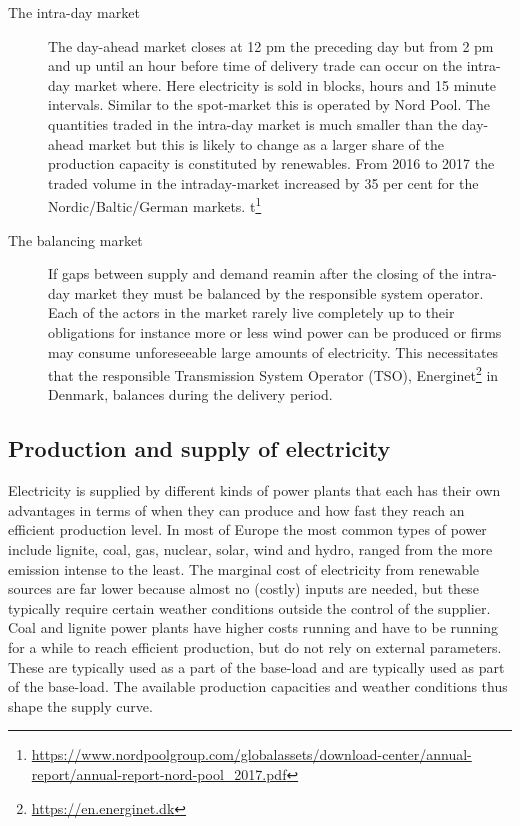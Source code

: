 \begin{description}
    \item [The intra-day market]
     The day-ahead market closes at 12 pm the preceding day but from 2 pm and up until an hour before time of delivery trade can occur on the intra-day market where. Here electricity is sold in blocks, hours and 15 minute intervals. Similar to the spot-market this is operated by Nord Pool. The quantities traded in the intra-day market is much smaller than the day-ahead market but this is likely to change as a larger share of the production capacity is constituted by renewables. From 2016 to 2017 the traded volume in the intraday-market increased by 35 per cent for the Nordic/Baltic/German markets.  t\footnote{\url{https://www.nordpoolgroup.com/globalassets/download-center/annual-report/annual-report-nord-pool_2017.pdf}}  %

    \item [The balancing market]
    If gaps between supply and demand reamin after the closing of the intra-day market they must be balanced by the responsible system operator. Each of the actors in the market rarely live completely up to their obligations for instance more or less wind power can be produced or firms may consume unforeseeable large amounts of electricity. This necessitates that the responsible Transmission System Operator (TSO), Energinet\footnote{\url{https://en.energinet.dk}} in Denmark, balances during the delivery period. %


\end{description}


\subsection{Production and supply of electricity}
\label{subsec:t_production}
Electricity is supplied by different kinds of power plants that each has their own advantages in terms of when they can produce and how fast they reach an efficient production level. In most of Europe the most common types of power include lignite, coal, gas, nuclear, solar, wind and hydro, ranged from the more emission intense to the least. The marginal cost of electricity from renewable sources are far lower because almost no (costly) inputs are needed, but these typically require certain weather conditions outside the control of the supplier. Coal and lignite power plants have higher costs running and have to be running for a while to reach efficient production, but do not rely on external parameters. These are typically used as a part of the base-load  and are typically used as part of the base-load. The available production capacities and weather conditions thus shape the supply curve.
\medskip 

